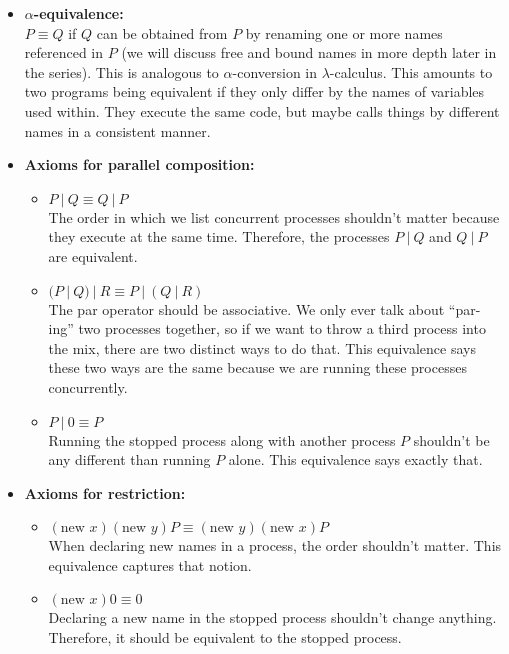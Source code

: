 \documentclass[12pt]{article}
\numberwithin{equation}{section}
\begin{document}
\begin{itemize}
\item \textbf{$\alpha$-equivalence:} \\
$P\equiv Q$ if $Q$ can be obtained from $P$ by renaming one or more names referenced in $P$ (we will discuss free and bound names in more depth later in the series). This is analogous to $\alpha$-conversion in $\lambda$-calculus. This amounts to two programs being equivalent if they only differ by the names of variables used within. They execute the same code, but maybe calls things by different names in a consistent manner.

\item \textbf{Axioms for parallel composition:}
\begin{itemize}
\item $P \ | \ Q \equiv Q \ | \ P$ \\
The order in which we list concurrent processes shouldn't matter because they execute at the same time. Therefore, the processes $P \ | \ Q$ and $Q \ | \ P$ are equivalent.

\item $(P \ | \ Q) \ | \ R \equiv P \ | \ (Q \ | \ R)$ \\
The par operator should be associative. We only ever talk about ``par-ing'' two processes together, so if we want to throw a third process into the mix, there are two distinct ways to do that. This equivalence says these two ways are the same because we are running these processes concurrently.

\item $P \ | \ 0 \equiv P$ \\
Running the stopped process along with another process $P$ shouldn't be any different than running $P$ alone. This equivalence says exactly that.
\end{itemize}

\item \textbf{Axioms for restriction:}
\begin{itemize}
\item $(\text{new } x)(\text{new } y)P \equiv (\text{new } y)(\text{new } x)P$ \\
When declaring new names in a process, the order shouldn't matter. This equivalence captures that notion.

\item $(\text{new } x)0 \equiv 0$ \\
Declaring a new name in the stopped process shouldn't change anything. Therefore, it should be equivalent to the stopped process.
\end{itemize}


\end{itemize}
\end{document}

